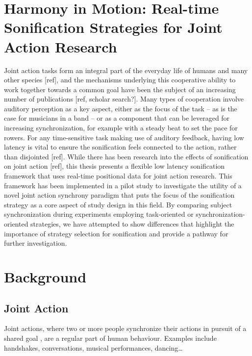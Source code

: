 \documentclass[10pt,a4paper,onecolumn]{article}
\begin{document}
\hypertarget{harmony-in-motion-real-time-sonification-strategies-for-joint-action-research}{%
\section{Harmony in Motion: Real-time Sonification Strategies for Joint Action Research}\label{harmony-in-motion-real-time-sonification-strategies-for-joint-action-research}}

Joint action tasks form an integral part of the everyday life of humans and many other species {[}ref{]},
and the mechanisms underlying this cooperative ability to work together towards a common goal have been
the subject of an increasing number of publications {[}ref, scholar search?{]}. Many types of cooperation
involve auditory perception as a key aspect, either as the focus of the task -- as is the case for
musicians in a band -- or as a component that can be leveraged for increasing synchronization,
for example with a steady beat to set the pace for rowers. For any time-sensitive task making
use of auditory feedback, having low latency is vital to ensure the sonification feels connected
to the action, rather than disjointed {[}ref{]}. While there has been research into the effects of
sonification on joint action {[}ref{]}, this thesis presents a flexible low latency sonification
framework that uses real-time positional data for joint action research. This framework has been
implemented in a pilot study to investigate the utility of a novel joint action synchrony paradigm
that puts the focus of the sonification strategy as a core aspect of study design in this field. By
comparing subject synchronization during experiments employing task-oriented or synchronization-oriented
strategies, we have attempted to show differences that highlight the importance of strategy selection
for sonification and provide a pathway for further investigation.

\hypertarget{background}{%
\section{Background}\label{background}}

\hypertarget{joint-action}{%
\subsection{Joint Action}\label{joint-action}}

Joint actions, where two or more people synchronize their actions in pursuit of a shared goal \autocite{knoblichPsychologicalResearchJoint2011}, are a regular part of human behaviour. Examples include handshakes, conversations, musical performances, dancing\ldots{}
\end{document}
